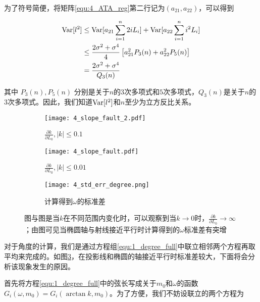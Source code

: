为了符号简便，将矩阵\ref{equ:4_ATA_reg}第二行记为$(a_{21}, a_{22})$，可以得到

\begin{equation}
	\begin{aligned}
		\mathrm{Var}[l^2] &\leq \mathrm{Var}[a_{21}\sum_{i=1}^n 2iL_i] + \mathrm{Var}[a_{22} \sum_{i=1}^ni^2L_i] \\
		&\leq \frac{2\sigma^2 + \sigma^4}{4}\left[ a_{21}^2 P_3(n) + a_{22}^2 P_5(n) \right] \\
		&=\frac{2\sigma^2 + \sigma^4}{Q_3(n)}
\end{aligned}
	\label{equ:4_var_finite}
\end{equation}

其中 $P_3(n), P_5(n)$ 分别是关于$n$的$3$次多项式和$5$次多项式，$Q_3(n)$是关于$n$的$3$次多项式。因此，我们知道$\mathrm{Var}[l^2]$和$n$至少为立方反比关系。

\begin{figure}[htbp]
  \centering

  \begin{subfigure}[b]{0.3\textwidth}
    \texttt{[image: 4\_slope\_fault\_2.pdf]}
    \caption{$\displaystyle \frac{\partial k}{\partial L_0}, |k| \leq 0.1 $}
    \label{fig:4_slope_fault:1}
  \end{subfigure}%
  \hfill
  \begin{subfigure}[b]{0.3\textwidth}
    \texttt{[image: 4\_slope\_fault.pdf]}
    \caption{$\displaystyle \frac{\partial k}{\partial L_0}, |k| \leq 0.01 $}
    \label{fig:4_slope_fault:2}
  \end{subfigure}%
  \hfill
  \begin{subfigure}[b]{0.3\textwidth}
    \texttt{[image: 4\_std\_err\_degree.png]}
    \caption{计算得到$\omega$的标准差}
    \label{fig:4_std_err_degree}
  \end{subfigure}

  \caption{图与图是当$k$在不同范围内变化时，可以观察到当$k \to 0$时，$\displaystyle \frac{\partial k}{\partial L_0} \to \infty$；由图可见当椭圆轴与射线接近平行时计算得到的$\omega$标准差有突增}
  \label{fig:4_analysis}
\end{figure} 

对于角度的计算，我们是通过方程组\ref{equ:1_degree_full}中联立相邻两个方程再取平均来完成的。如图\ref{fig:4_std_err_degree}，在投影线和椭圆的轴接近平行时标准差较大，下面将会分析该现象发生的原因。

首先将方程\ref{equ:1_degree_full}中的弦长写成关于$m_0$和$\omega$的函数$G_i(\omega, m_0) = G_i(\arctan k, m_0)$。为了方便，我们不妨设联立的两个方程为

